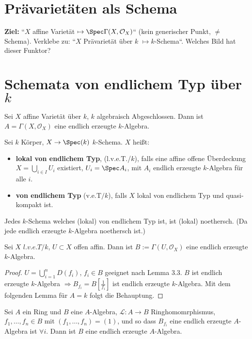\section*{Prävarietäten als Schema}

\textbf{Ziel: }``$X$ affine Varietät $\mapsto\Spec\Gamma(X,\mathcal{O}_{X})$``
(kein generischer Punkt, $\neq$ Schema). Verklebe zu: ``$X$ Prävarietät
über $k$ $\mapsto k$-Schema``. Welches Bild hat dieser Funktor?

\section{Schemata von endlichem Typ über $k$}

Sei $X$ affine Varietät über $k$, $k$ algebraisch Abgeschlossen.
Dann ist $A=\Gamma(X,\mathcal{O}_{X})$ eine endlich erzeugte $k$-Algebra.
\begin{defn}[25]
Sei $k$ Körper, $X\rightarrow\Spec(k)$ $k$-Schema. $X$ heißt:
\begin{itemize}
\item \textbf{lokal von endlichem Typ}, (l.v.e.T./$k$), falls eine affine
offene Überdeckung $X=\bigcup_{i\in I}U_{i}$ existiert, $U_{i}=\Spec A_{i}$,
mit $A_{i}$ endlich erzeugte $k$-Algebra für alle $i$.
\item \textbf{von endlichem Typ} (v.e.T$/k$), falls $X$ lokal von endlichem
Typ und quasi-kompakt ist.
\end{itemize}
\end{defn}

\begin{rem*}
Jedes $k$-Schema welches (lokal) von endlichem Typ ist, ist (lokal)
noethersch. (Da jede endlich erzeugte $k$-Algebra noethersch ist.)
\end{rem*}
\begin{prop}[26]
Sei $X$ $l.v.e.T/k$, $U\subset X$ offen affin. Dann ist $B:=\Gamma(U,\mathcal{O}_{X})$
eine endlich erzeugte $k$-Algebra.
\end{prop}

\begin{proof}
$U=\bigcup_{i=1}^{n}D(f_{i})$, $f_{i}\in B$ geeignet nach Lemma
3.3. $B$ ist endlich erzeugte $k$-Algebra $\Longrightarrow B_{f_{i}}=B\left[\frac{1}{f_{i}}\right]$
ist endlich erzeugte $k$-Algebra. Mit dem folgenden Lemma für $A=k$
folgt die Behauptung.
\end{proof}
\begin{lem}[28]
Sei $A$ ein Ring und $B$ eine $A$-Algebra, $\mathcal{L}:A\rightarrow B$
Ringhomomrphismus, $f_{1},\ldots,f_{n}\in B$ mit $(f_{1},\ldots,f_{n})=(1)$,
und so dass $B_{f_{i}}$ eine endlich erzeugte $A$-Algebra ist $\forall i$.
Dann ist $B$ eine endlich erzeugte $A$-Algebra.
\end{lem}

